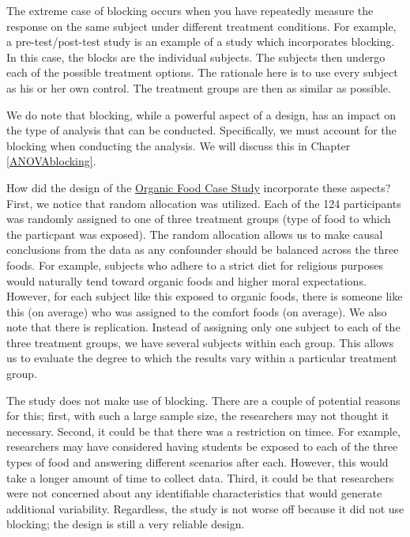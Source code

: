 \documentclass[]{book}
\theoremstyle{definition}
\theoremstyle{definition}
\theoremstyle{definition}
\theoremstyle{remark}
\begin{document}
The extreme case of blocking occurs when you have repeatedly measure the
response on the same subject under different treatment conditions. For
example, a pre-test/post-test study is an example of a study which
incorporates blocking. In this case, the blocks are the individual
subjects. The subjects then undergo each of the possible treatment
options. The rationale here is to use every subject as his or her own
control. The treatment groups are then as similar as possible.

We do note that blocking, while a powerful aspect of a design, has an
impact on the type of analysis that can be conducted. Specifically, we
must account for the blocking when conducting the analysis. We will
discuss this in Chapter \ref{ANOVAblocking}.

How did the design of the \protect\hyperlink{CaseOrganic}{Organic Food
Case Study} incorporate these aspects? First, we notice that random
allocation was utilized. Each of the 124 participants was randomly
assigned to one of three treatment groups (type of food to which the
particpant was exposed). The random allocation allows us to make causal
conclusions from the data as any confounder should be balanced across
the three foods. For example, subjects who adhere to a strict diet for
religious purposes would naturally tend toward organic foods and higher
moral expectations. However, for each subject like this exposed to
organic foods, there is someone like this (on average) who was assigned
to the comfort foods (on average). We also note that there is
replication. Instead of assigning only one subject to each of the three
treatment groups, we have several subjects within each group. This
allows us to evaluate the degree to which the results vary within a
particular treatment group.

The study does not make use of blocking. There are a couple of potential
reasons for this; first, with such a large sample size, the researchers
may not thought it necessary. Second, it could be that there was a
restriction on timee. For example, researchers may have considered
having students be exposed to each of the three types of food and
answering different scenarios after each. However, this would take a
longer amount of time to collect data. Third, it could be that
researchers were not concerned about any identifiable characteristics
that would generate additional variability. Regardless, the study is not
worse off because it did not use blocking; the design is still a very
reliable design.
\end{document}
